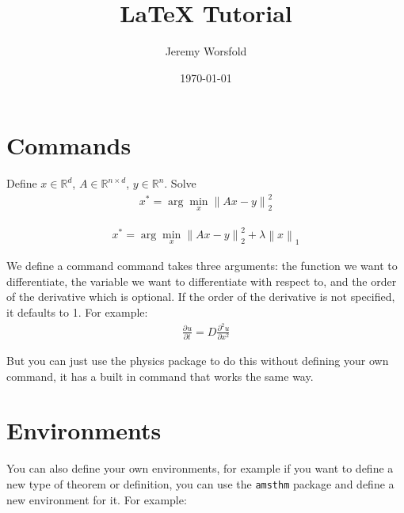 \documentclass{article}
\title{LaTeX Tutorial}
\author{Jeremy Worsfold}
\date{\today}
\newcommand{\R}{\mathbb{R}} %
\newcommand{\norm}[1]{\left\lVert#1\right\rVert} %
\begin{document}
\maketitle

\section{Commands}

Define $x\in \R^d$, $A\in \R^{n\times d}$, $y\in \R^n$. Solve
\begin{align}
    x^* = \arg\min_x \norm{Ax-y}_2^2
\end{align}

\newcommand{\regularization}{\lambda}

\begin{align}
    x^* = \arg\min_x \norm{Ax-y}_2^2 + \regularization \norm{x}_1
\end{align}

\newcommand{\pdv}[3][]{\frac{\partial^{#1} #2}{\partial #3^{#1}}} 
We define a command command takes three arguments: the function we want to differentiate, the variable we want to differentiate with respect to, and the order of the derivative which is optional. If the order of the derivative is not specified, it defaults to 1. For example:
\begin{align}
    \pdv{u}{t} = D \pdv[2]{u}{x}
\end{align}

But you can just use the physics package to do this without defining your own command, it has a built in command that works the same way.

\section{Environments}

You can also define your own environments, for example if you want to define a new type of theorem or definition, you can use the \texttt{amsthm} package and define a new environment for it. For example:

\newenvironment{myboxed}
{ %
    \begin{center}
    \begin{tabular}{|p{0.9\textwidth}|}
    \hline\\
}
{ %
    \\\\\hline
    \end{tabular} 
    \end{center}
}
\end{document}
